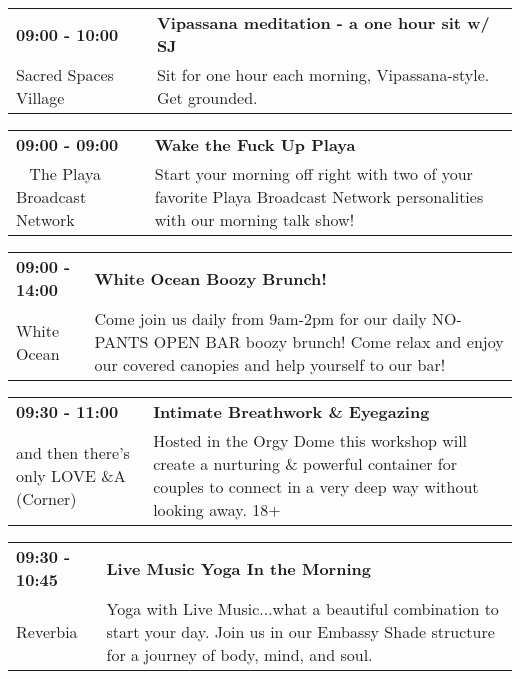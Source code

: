 \begin{tabular}{ p{1in} p{2.2in} }
    \textbf{09:00 - 10:00} & \textbf{Vipassana meditation - a one hour sit w/ SJ} \\
    Sacred Spaces Village \newline  & Sit for one hour each morning, Vipassana-style. Get grounded. \\
    \hline 
\end{tabular}
    
\begin{tabular}{ p{1in} p{2.2in} }
    \textbf{09:00 - 09:00} & \textbf{Wake the Fuck Up Playa} \\
    ~ \newline The Playa Broadcast Network & Start your morning off right with two of your favorite Playa Broadcast Network personalities with our morning talk show! \\
    \hline 
\end{tabular}
    
\begin{tabular}{ p{1in} p{2.2in} }
    \textbf{09:00 - 14:00} & \textbf{White Ocean Boozy Brunch!} \\
    White Ocean \newline  & Come join us daily from 9am-2pm for our daily NO-PANTS OPEN BAR boozy brunch! Come relax and enjoy our covered canopies and help yourself to our bar! \\
    \hline 
\end{tabular}
    
\begin{tabular}{ p{1in} p{2.2in} }
    \textbf{09:30 - 11:00} & \textbf{Intimate Breathwork \& Eyegazing} \\
    and then there's only LOVE \newline 4\&A (Corner) & Hosted in the Orgy Dome this workshop will create a nurturing \& powerful container for couples to connect in a very deep way without looking away. 18+ \\
    \hline 
\end{tabular}
    
\begin{tabular}{ p{1in} p{2.2in} }
    \textbf{09:30 - 10:45} & \textbf{Live Music Yoga In the Morning } \\
    Reverbia \newline  & Yoga with Live Music...what a beautiful combination to start your day. Join us in our Embassy Shade structure for a journey of body, mind, and soul. \\
    \hline 
\end{tabular}
    
